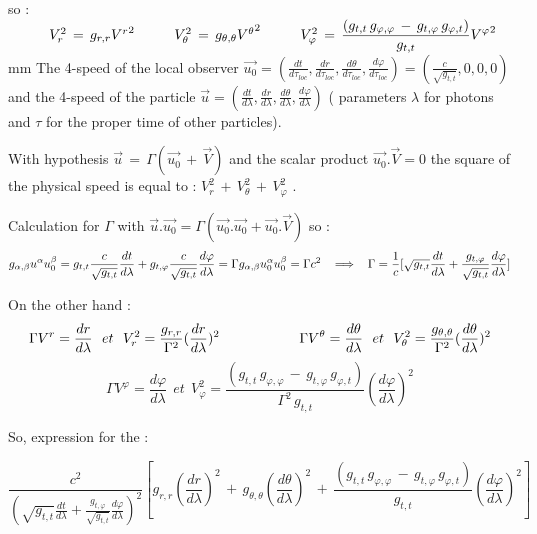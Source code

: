 \documentclass [12pt]{article}
\def\ph#1{\hskip #1}
\def\pv#1{\vskip #1}
\begin{document}
so : $\ph 10mmV_r^2\,=\, g_{r,r}{V^r}^2 \ph 10mm V_\theta^2\,=\,g_{\theta,\theta}{V^\theta}^2 \ph 10mmV_\varphi^2\,=\,\displaystyle\frac {(g_{t,t}\,g_{\varphi,\varphi}\,-\,g_{t,\varphi}\,g_{\varphi,t})}{g_{t,t}} {V^\varphi}^2$
\pv 3mm
The 4-speed of the local observer $\vec{u_0}=(\displaystyle\frac{dt}{d\tau_{loc}},\frac{dr}{d\tau_{loc}},\frac{d\theta}{d\tau_{loc}},\frac{d\varphi}{d\tau_{loc}})
=(\frac{c}{\sqrt{  g_{t,t} }},0,0,0)  $ and  the 4-speed of the particle $\vec{u}=(\displaystyle\frac{dt}{d\lambda},\frac{dr}{d\lambda},
\frac{d\theta}{d\lambda},\frac{d\varphi}{d\lambda})$ ( parameters $\lambda$ for photons and $\tau$ for the proper time of other particles).

With hypothesis $ \vec u\,=\,\Gamma(\vec {u_0}\,+\,\vec {V})$ and the scalar product $\vec {u_0} . \vec {V} = 0$ 
 the square of the physical speed is equal to : $V_r^2\,+\,V_\theta^2\,+\,V_\varphi^2$ .

Calculation for $\Gamma$ with $\vec u.\vec {u_0}=\Gamma(\vec {u_0}.\vec {u_0}+\vec {u_0}.\vec {V})$ so : 
$$ g_{\alpha,\beta}u^\alpha u_0^\beta= g_{t,t}\displaystyle\frac{c}{\sqrt{  g_{t,t} }}\frac{dt}{d\lambda} +g_{t,\varphi}\displaystyle\frac{c}{\sqrt{  g_{t,t} }}\frac{d\varphi}{d\lambda}  = \Gamma g_{\alpha,\beta}u_0^\alpha u_0^\beta=\Gamma c^2 \ph 3mm\Longrightarrow \ph 3mm  \Gamma= \frac{1}{c} [ \sqrt{g_{t,t}}\frac{dt}{d\lambda} +\frac{g_{t,\varphi}}{\sqrt{g_{t,t} }}\frac{d\varphi}{d\lambda}  ]    $$

On the other hand : 
 $$ \Gamma V^r=\displaystyle \frac{dr}{d\lambda}\ \ et\ \  V_r^2=\frac{  g_{r,r}  }{\Gamma^2}({\frac{dr}{d\lambda}})^2 
\ph 20mm \Gamma V^\theta=\displaystyle \frac{d\theta}{d\lambda}\ \ et\ \ V_\theta^2=\frac{  g_{\theta,\theta}   }{\Gamma^2}({\frac{d\theta}{d\lambda}})^2$$
 $$ \Gamma V^\varphi=\displaystyle \frac{d\varphi}{d\lambda}\ \  et \ \ 
 V_\varphi^2=\displaystyle\frac {(g_{t,t}\,g_{\varphi,\varphi}\,-\,g_{t,\varphi}\,g_{\varphi,t})}{\Gamma^2\,g_{t,t}}({\frac{d\varphi}{d\lambda}})^2$$

So, expression for the  :

$$\displaystyle\frac{c^2}{(\sqrt{g_{t,t}}\displaystyle\frac{dt}{d\lambda} +\frac{g_{t,\varphi}}{\sqrt{g_{t,t} }}\frac{d\varphi}{d\lambda})^2} \left[   g_{r,r}   (\frac{dr}{d\lambda})^2 \,+\,   g_{\theta,\theta}   (\frac{d\theta}{d\lambda})^2\,+\,\displaystyle\frac {(g_{t,t}\,g_{\varphi,\varphi}\,-\,g_{t,\varphi}\,g_{\varphi,t})}{g_{t,t}} (\frac{d\varphi}{d\lambda})^2 \right]  $$
\end{document}
